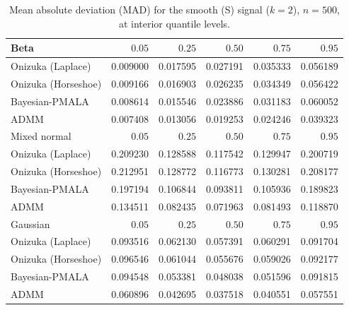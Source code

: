 \begin{table}[!htbp]
\centering
\small
\caption{Mean absolute deviation (MAD) for the smooth (S) signal ($k=2$), $n=500$, at interior quantile levels.}
\label{tab:s_int_mad}
\begin{tabular}{lrrrrr}
\toprule
Beta & $0.05$ & $0.25$ & $0.50$ & $0.75$ & $0.95$ \\
\midrule
Onizuka (Laplace) & 0.009000 & 0.017595 & 0.027191 & 0.035333 & 0.056189 \\
Onizuka (Horseshoe) & 0.009166 & 0.016903 & 0.026235 & 0.034349 & 0.056422 \\
Bayesian-PMALA & 0.008614 & 0.015546 & 0.023886 & 0.031183 & 0.060052 \\
ADMM & 0.007408 & 0.013056 & 0.019253 & 0.024246 & 0.039323 \\
\midrule
Mixed normal & $0.05$ & $0.25$ & $0.50$ & $0.75$ & $0.95$ \\
\midrule
Onizuka (Laplace) & 0.209230 & 0.128588 & 0.117542 & 0.129947 & 0.200719 \\
Onizuka (Horseshoe) & 0.212951 & 0.128772 & 0.116773 & 0.130281 & 0.208177 \\
Bayesian-PMALA & 0.197194 & 0.106844 & 0.093811 & 0.105936 & 0.189823 \\
ADMM & 0.134511 & 0.082435 & 0.071963 & 0.081493 & 0.118870 \\
\midrule
Gaussian & $0.05$ & $0.25$ & $0.50$ & $0.75$ & $0.95$ \\
\midrule
Onizuka (Laplace) & 0.093516 & 0.062130 & 0.057391 & 0.060291 & 0.091704 \\
Onizuka (Horseshoe) & 0.096546 & 0.061044 & 0.055676 & 0.059026 & 0.092177 \\
Bayesian-PMALA & 0.094548 & 0.053381 & 0.048038 & 0.051596 & 0.091815 \\
ADMM & 0.060896 & 0.042695 & 0.037518 & 0.040551 & 0.057551 \\
\bottomrule
\end{tabular}
\end{table}

